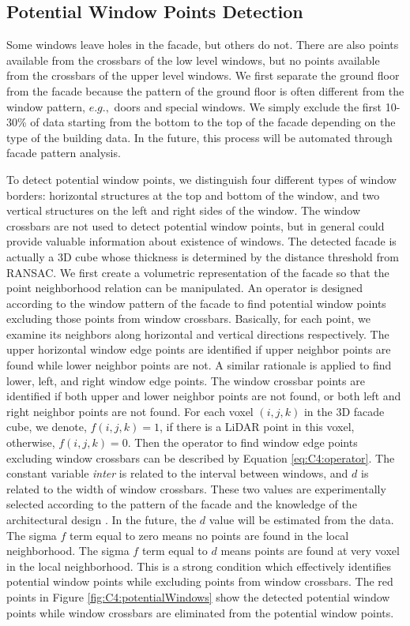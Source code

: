 \subsection{Potential Window Points Detection}

Some windows leave holes in the facade, but others do not. There are also points available from the crossbars of the low level windows, but no points available from the crossbars of the upper level windows. We first separate the ground floor from the facade because the pattern of the ground floor is often different from the window pattern, $e.g.,$ doors and special windows. We simply exclude the first 10-30\% of data starting from the bottom to the top of the facade depending on the type of the building data. In the future, this process will be automated through facade pattern analysis.
  
To detect potential window points, we distinguish four different types of window borders: horizontal structures at the top and bottom of the window, and two vertical structures on the left and right sides of the window. The window crossbars are not used to detect potential window points, but in general could provide valuable information about existence of windows. The detected facade is actually a 3D cube whose thickness is determined by the distance threshold from RANSAC. We first create a volumetric representation of the facade so that the point neighborhood relation can be manipulated. An operator is designed according to the window pattern of the facade to find potential window points excluding those points from window crossbars. Basically, for each point, we examine its neighbors along horizontal and vertical directions respectively. The upper horizontal window edge points are identified if upper neighbor points are found while lower neighbor points are not. A similar rationale is applied to find lower, left, and right window edge points. The window crossbar points are identified if both upper and lower neighbor points are not found, or both left and right neighbor points are not found. For each voxel $(i, j, k)$ in the 3D facade cube, we denote, $f (i, j, k) = 1$, if there is a LiDAR point in this voxel, otherwise, $f (i, j, k) = 0$. Then the operator to find window edge points excluding window crossbars can be described by Equation \ref{eq:C4:operator}. The constant variable {\it inter} is related to the interval between windows, and $d$ is related to the width of window crossbars. These two values are experimentally selected according to the pattern of the facade and the knowledge of the architectural design . In the future, the $d$ value will be estimated from the data. The sigma $f$ term equal to zero means no points are found in the local neighborhood. The sigma $f$ term equal to $d$ means points are found at very voxel in the local neighborhood. This is a strong condition which effectively identifies potential window points while excluding points from window crossbars. The red points in Figure \ref{fig:C4:potentialWindows} show the detected potential window points while window crossbars are eliminated from the potential window points. 

